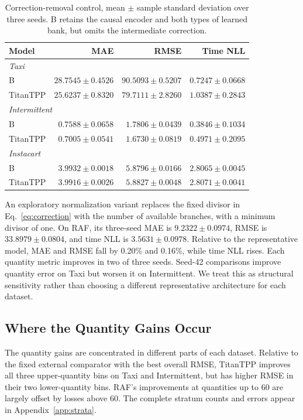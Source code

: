 \documentclass[runningheads]{llncs}
\begin{document}
\begin{table}[t]
\caption{Correction-removal control, mean $\pm$ sample standard deviation
over three seeds. B retains the causal encoder and both types of learned
bank, but omits the intermediate correction.}
\label{tab:ablation}\centering\small
\begin{tabular}{lrrr}
\toprule
Model & MAE & RMSE & Time NLL\\
\midrule
\multicolumn{4}{l}{\textit{Taxi}}\\
B & $28.7545\pm0.4526$ & $90.5093\pm0.5207$ & $0.7247\pm0.0668$\\
TitanTPP & $25.6237\pm0.8320$ & $79.7111\pm2.8260$ & $1.0387\pm0.2843$\\
\midrule
\multicolumn{4}{l}{\textit{Intermittent}}\\
B & $0.7588\pm0.0658$ & $1.7806\pm0.0439$ & $0.3846\pm0.1034$\\
TitanTPP & $0.7005\pm0.0541$ & $1.6730\pm0.0819$ & $0.4971\pm0.2095$\\
\midrule
\multicolumn{4}{l}{\textit{Instacart}}\\
B & $3.9932\pm0.0018$ & $5.8796\pm0.0166$ & $2.8065\pm0.0045$\\
TitanTPP & $3.9916\pm0.0026$ & $5.8827\pm0.0048$ & $2.8071\pm0.0041$\\
\bottomrule
\end{tabular}
\end{table}

An exploratory normalization variant replaces the fixed divisor in
Eq.~\eqref{eq:correction} with the number of available branches, with a
minimum divisor of one. On RAF, its three-seed MAE is $9.2322\pm0.0974$,
RMSE is $33.8979\pm0.0804$, and time NLL is $3.5631\pm0.0978$.
Relative to the representative model, MAE and RMSE fall by 0.20\% and
0.16\%, while time NLL rises. Each quantity metric improves in two of three
seeds. Seed-42 comparisons improve quantity error on Taxi but worsen it on
Intermittent. We treat this as structural sensitivity rather than choosing a
different representative architecture for each dataset.

\subsection{Where the Quantity Gains Occur}
The quantity gains are concentrated in different parts of each dataset.
Relative to the fixed external comparator with the best overall RMSE,
TitanTPP improves all three upper-quantity bins on Taxi and Intermittent,
but has higher RMSE in their two lower-quantity bins. RAF's improvements
at quantities up to 60 are largely offset by losses above 60. The complete
stratum counts and errors appear in Appendix~\ref{app:strata}.
\end{document}
